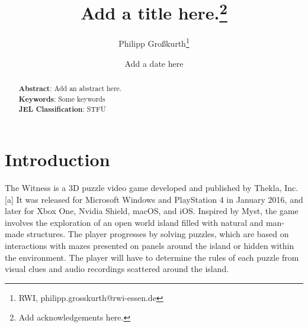 \documentclass[11pt,a4paper]{scrartcl}
\begin{document}
\singlespacing

\title{Add a title here.\thanks{Add acknowledgements here.}}

\date{Add a date here}

\author{Philipp Gro{\ss}kurth\thanks{RWI, philipp.grosskurth@rwi-essen.de}}

\maketitle\thispagestyle{empty}



\begin{abstract}

\noindent\textbf{Abstract}: Add an abstract here.
\\

\noindent\textbf{Keywords}: Some keywords \\
\noindent\textbf{JEL Classification}: STFU  \\

\end{abstract}

\doublespacing		%
\newpage
\pagestyle{plain}

\tableofcontents
\newpage
\section{Introduction}\label{sec:introduction}


The Witness is a 3D puzzle video game developed and published by Thekla, Inc.[a] It was released for Microsoft Windows and PlayStation 4 in January 2016, and later for Xbox One, Nvidia Shield, macOS, and iOS. Inspired by Myst, the game involves the exploration of an open world island filled with natural and man-made structures. The player progresses by solving puzzles, which are based on interactions with mazes presented on panels around the island or hidden within the environment. The player will have to determine the rules of each puzzle from visual clues and audio recordings scattered around the island.
\end{document}
